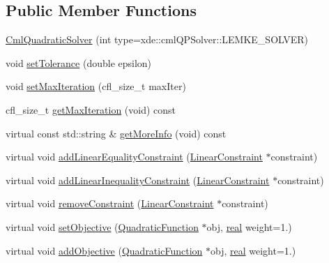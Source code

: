 \subsection*{Public Member Functions}
\begin{DoxyCompactItemize}
\item 
\hyperlink{classocra_1_1CmlQuadraticSolver_a4ef339a5d511aff62bf4f6669fa894b8}{Cml\+Quadratic\+Solver} (int type=xde\+::cml\+Q\+P\+Solver\+::\+L\+E\+M\+K\+E\+\_\+\+S\+O\+L\+V\+ER)
\item 
void \hyperlink{classocra_1_1CmlQuadraticSolver_a6c508788b75053d2bbcc7a3fee4ba26e}{set\+Tolerance} (double epsilon)
\item 
void \hyperlink{classocra_1_1CmlQuadraticSolver_a47a17923b7fdf4d8137fb41e240831d6}{set\+Max\+Iteration} (cfl\+\_\+size\+\_\+t max\+Iter)
\item 
cfl\+\_\+size\+\_\+t \hyperlink{classocra_1_1CmlQuadraticSolver_af098f007e13472efa4e713d5a98fbbbf}{get\+Max\+Iteration} (void) const 
\item 
virtual const std\+::string \& \hyperlink{classocra_1_1CmlQuadraticSolver_ae7e5950566f3c121e3f5d9ba7051b566}{get\+More\+Info} (void) const 
\item 
virtual void \hyperlink{classocra_1_1CmlQuadraticSolver_afea0aeb47c39f7fb8b3ce068f3d09885}{add\+Linear\+Equality\+Constraint} (\hyperlink{namespaceocra_ae8b87cf4099be3efc3b410019ad2046e}{Linear\+Constraint} $\ast$constraint)
\item 
virtual void \hyperlink{classocra_1_1CmlQuadraticSolver_a5bbf7066fb72a418a174aece3ac65bf5}{add\+Linear\+Inequality\+Constraint} (\hyperlink{namespaceocra_ae8b87cf4099be3efc3b410019ad2046e}{Linear\+Constraint} $\ast$constraint)
\item 
virtual void \hyperlink{classocra_1_1CmlQuadraticSolver_a570e7be65f21d67e41a0f030d5134e4e}{remove\+Constraint} (\hyperlink{namespaceocra_ae8b87cf4099be3efc3b410019ad2046e}{Linear\+Constraint} $\ast$constraint)
\item 
virtual void \hyperlink{classocra_1_1CmlQuadraticSolver_ad286753e3e35fa17f4aef9f8a75bd5b1}{set\+Objective} (\hyperlink{classocra_1_1QuadraticFunction}{Quadratic\+Function} $\ast$obj, \hyperlink{namespaceocra_af4478308ca113669e67d72f9a3050469}{real} weight=1.)
\item 
virtual void \hyperlink{classocra_1_1CmlQuadraticSolver_a531381b1498b0ad4e460e5a2a75da9b4}{add\+Objective} (\hyperlink{classocra_1_1QuadraticFunction}{Quadratic\+Function} $\ast$obj, \hyperlink{namespaceocra_af4478308ca113669e67d72f9a3050469}{real} weight=1.)

\end{DoxyCompactItemize}
